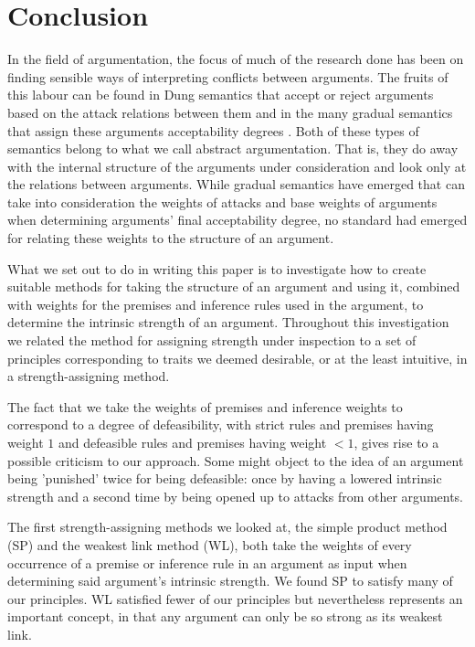\documentclass[runningheads]{llncs}
\begin{document}
\section{Conclusion}
In the field of argumentation, the focus of much of the research done has been on finding sensible ways of interpreting conflicts between arguments. The fruits of this labour can be found in Dung semantics that accept or reject arguments based on the attack relations between them \cite{DBLP:journals/ai/Dung95} and in the many gradual semantics that assign these arguments acceptability degrees \cite{DBLP:conf/atal/AmgoudD19}. Both of these types of semantics belong to what we call abstract argumentation. That is, they do away with the internal structure of the arguments under consideration and look only at the relations between arguments. While gradual semantics have emerged that can take into consideration the weights of attacks and base weights of arguments when determining arguments' final acceptability degree, no standard had emerged for relating these weights to the structure of an argument.

What we set out to do in writing this paper is to investigate how to create suitable methods for taking the structure of an argument and using it, combined with weights for the premises and inference rules used in the argument, to determine the intrinsic strength of an argument. Throughout this investigation we related the method for assigning strength under inspection to a set of principles corresponding to traits we deemed desirable, or at the least intuitive, in a strength-assigning method.

The fact that we take the weights of premises and inference weights to correspond to a degree of defeasibility, with strict rules and premises having weight $1$ and defeasible rules and premises having weight $<1$, gives rise to a possible criticism to our approach. Some might object to the idea of an argument being 'punished' twice for being defeasible: once by having a lowered intrinsic strength and a second time by being opened up to attacks from other arguments.

The first strength-assigning methods we looked at, the simple product method (SP) and the weakest link method (WL), both take the weights of every occurrence of a premise or inference rule in an argument as input when determining said argument's intrinsic strength. We found SP to satisfy many of our principles. WL satisfied fewer of our principles but nevertheless represents an important concept, in that any argument can only be so strong as its weakest link.
\end{document}
